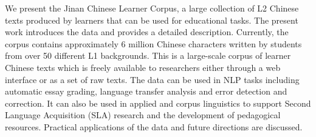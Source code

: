We present the Jinan Chinese Learner Corpus, a large collection of L2 Chinese texts produced by learners that can be used for educational tasks. The present work introduces the data and provides a detailed description. Currently, the corpus contains approximately 6 million Chinese characters written by students from over 50 different L1 backgrounds. This is a large-scale corpus of learner Chinese texts which is freely available to researchers either through a web interface or as a set of raw texts. The data can be used in NLP tasks including automatic essay grading, language transfer analysis and error detection and correction. It can also be used in applied and corpus linguistics to support Second Language Acquisition (SLA) research and the development of pedagogical resources. Practical applications of the data and future directions are discussed.
